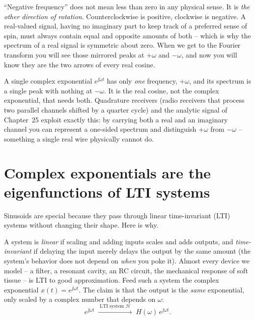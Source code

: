 \begin{intuitionbox}
``Negative frequency'' does not mean less than zero in any physical sense. It is
\emph{the other direction of rotation}. Counterclockwise is positive, clockwise is negative.
A real-valued signal, having no imaginary part to keep track of a preferred sense of spin, must
always contain equal and opposite amounts of both -- which is why the spectrum of a real signal is
symmetric about zero. When we get to the Fourier transform you will see those mirrored peaks at
$+\omega$ and $-\omega$, and now you will know they are the two arrows of every real cosine.
\end{intuitionbox}

\begin{trapbox}
A single complex exponential $e^{\jj\omega t}$ has only \emph{one} frequency, $+\omega$, and its
spectrum is a single peak with nothing at $-\omega$. It is the real cosine, not the complex
exponential, that needs both. Quadrature receivers (radio receivers that process two parallel channels shifted by a quarter cycle) and the analytic signal of
Chapter~25 exploit exactly this: by carrying both a real and an imaginary
channel you can represent a one-sided spectrum and distinguish $+\omega$ from $-\omega$ -- something
a single real wire physically cannot do.
\end{trapbox}

\section{Complex exponentials are the eigenfunctions of LTI systems}
\label{ch04:eigen}

Sinusoids are special because they pass through linear time-invariant (LTI) systems without changing their shape. Here is why.

A system is \emph{linear} if scaling and adding inputs scales and adds outputs, and
\emph{time-invariant} if delaying the input merely delays the output by the same amount (the
system's behavior does not depend on \emph{when} you poke it). Almost every device we model -- a
filter, a resonant cavity, an RC circuit, the mechanical response of soft tissue -- is LTI to good
approximation. Feed such a system the complex exponential $x(t) = e^{\jj\omega t}$. The claim is
that the output is the \emph{same} exponential, only scaled by a complex number that depends on
$\omega$:
\[
  e^{\jj\omega t} \;\xrightarrow{\;\text{LTI system } \mathcal{H}\;}\; H(\omega)\, e^{\jj\omega t}.
\]

